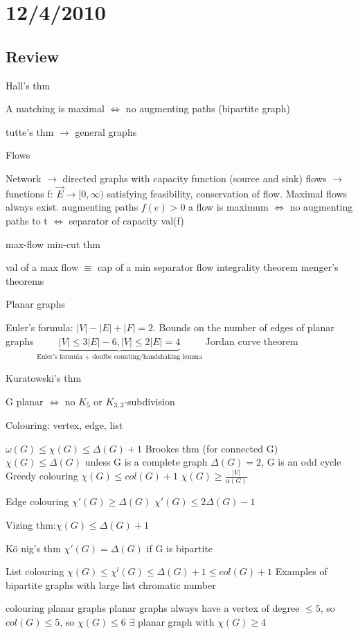\documentclass{article}
\begin{document}
\section*{12/4/2010}
\subsection*{Review}

Hall's thm

A matching is maximal $\iff$ no augmenting paths (bipartite graph)

tutte's thm $\rightarrow$ general graphs

Flows

Network $\rightarrow$ directed graphs with capacity function (source and sink)
flows $\rightarrow$ functions f: $\overrightarrow{E} \rightarrow [0,\infty)$ satisfying feasibility, conservation of flow.
Maximal flows always exist.
augmenting paths $f(e)>0$
a flow is maximum $\iff$ no augmenting paths to t $\iff$ separator of capacity val(f)

max-flow min-cut thm

val of a max flow $\equiv$ cap of a min separator
flow integrality theorem
menger's theorems

Planar graphs

Euler's formula: $|V| - |E| + |F| = 2$.
Bounds on the number of edges of planar graphs $\underbrace{|V| \le 3 |E| - 6, |V| \le 2 |E| =4}_{\text{Euler's formula + doulbe counting/handshaking lemma}}$
Jordan curve theorem

Kuratowski's thm

G planar $\iff$ no $K_5$ or $K_{3,3}$-subdivision

Colouring: vertex, edge, list

$\omega(G) \le \chi(G) \le \Delta(G) +1$
Brookes thm (for connected G)
$\chi(G) \le \Delta(G)$ unless G is a complete graph $\Delta(G) =2$, G is an odd cycle
Greedy colouring $\chi(G)\le col(G)+1$
$\chi(G) \ge \frac{|V|}{\alpha(G)} $

Edge colouring
$\chi'(G) \ge \Delta(G)$
$\chi'(G) \le 2 \Delta(G) -1$

Vizing thm:$\chi(G) \le \Delta(G) +1$

K\"o nig's thm $\chi'(G)=\Delta(G)$ if G is bipartite

List colouring
$\chi(G) \le \chi^l(G) \le \Delta(G) +1 \le col(G) +1$
Examples of bipartite graphs with large list chromatic number

colouring planar graphs
planar graphs always have a vertex of degree $\le 5$, so $col(G)\le 5$, so $\chi(G)\le 6$
$\exists$ planar graph with $\chi(G)\ge 4$
\end{document}
